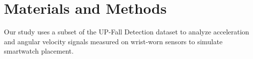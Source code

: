 \documentclass{llncs}
\begin{document}







    
\section{Materials and Methods}
Our study uses a subset of the UP-Fall Detection dataset to analyze acceleration and angular velocity signals measured on wrist-worn sensors to simulate smartwatch placement.
\end{document}
